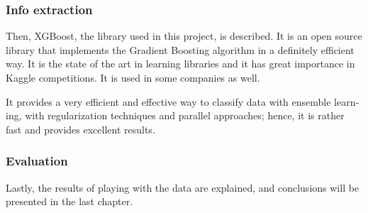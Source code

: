 \begin{otherlanguage}{british}
  \subsubsection*{Info extraction}
  Then, XGBoost, the library used in this project, is described. It is an open source library that implements the Gradient Boosting algorithm in a definitely efficient way. It is the state of the art in learning libraries and it has great importance in Kaggle competitions. It is used in some companies as well.

  It provides a very efficient and effective way to classify data with ensemble learning, with regularization techniques and parallel approaches; hence, it is rather fast and provides excellent results.

  \subsubsection*{Evaluation}
  Lastly, the results of playing with the data are explained, and conclusions will be presented in the last chapter.


\end{otherlanguage}

